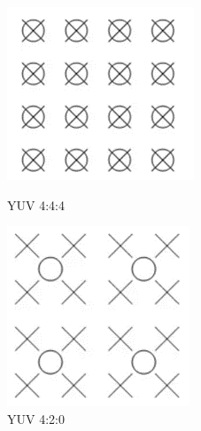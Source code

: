 \documentclass{article}
\begin{document}
\FloatBarrier
\begin{figure}[htbp]
    \centering
    \begin{minipage}[t]{0.45\textwidth}
        \centering
        \includegraphics[width=\textwidth]{assets/YUV444.png}
        \caption{YUV 4:4:4}
        \label{fig:example1}
    \end{minipage}
    \hfill  %
    \begin{minipage}[t]{0.45\textwidth}
        \centering
        \includegraphics[width=\textwidth]{assets/YUV420.png}
        \caption{YUV 4:2:0}
        \label{fig:example2}
    \end{minipage}
\end{figure}
\FloatBarrier
\end{document}
